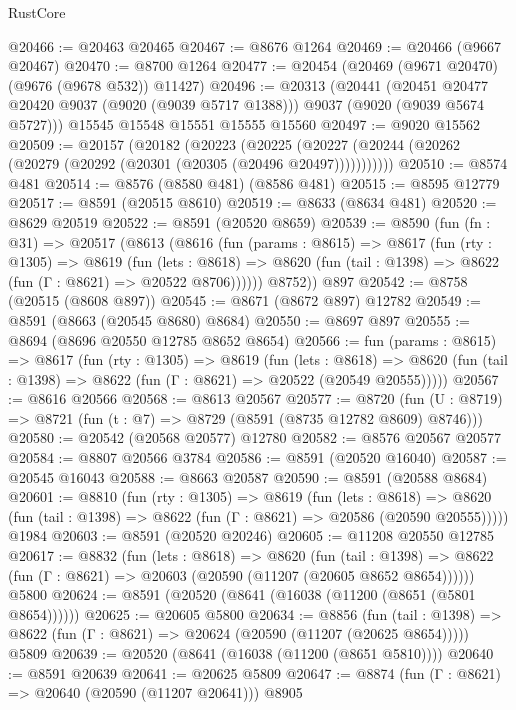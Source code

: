 \begin{lexlean}{RustCore}
\begin{coremodule}
@20466 := @20463 @20465
@20467 := @8676 @1264
@20469 := @20466 (@9667 @20467)
@20470 := @8700 @1264
@20477 := @20454 (@20469 (@9671 @20470) (@9676 (@9678 @532)) @11427)
@20496 := @20313
    (@20441
      (@20451 @20477 @20420 @9037 (@9020 (@9039 @5717 @1388)))
      @9037
      (@9020 (@9039 @5674 @5727)))
    @15545
    @15548
    @15551
    @15555
    @15560
@20497 := @9020 @15562
@20509 := @20157
    (@20182
      (@20223
        (@20225 (@20227 (@20244 (@20262 (@20279 (@20292 (@20301 (@20305 (@20496 @20497)))))))))))
@20510 := @8574 @481
@20514 := @8576 (@8580 @481) (@8586 @481)
@20515 := @8595 @12779
@20517 := @8591 (@20515 @8610)
@20519 := @8633 (@8634 @481)
@20520 := @8629 @20519
@20522 := @8591 (@20520 @8659)
@20539 := @8590
    (fun (fn : @31) =>
    @20517
      (@8613
        (@8616
          (fun (params : @8615) =>
          @8617
            (fun (rty : @1305) =>
            @8619
              (fun (lets : @8618) =>
              @8620 (fun (tail : @1398) => @8622 (fun (Γ : @8621) => @20522 @8706))))))
        @8752))
    @897
@20542 := @8758 (@20515 (@8608 @897))
@20545 := @8671 (@8672 @897) @12782
@20549 := @8591 (@8663 (@20545 @8680) @8684)
@20550 := @8697 @897
@20555 := @8694 (@8696 @20550 @12785 @8652 @8654)
@20566 := fun (params : @8615) =>
  @8617
    (fun (rty : @1305) =>
    @8619
      (fun (lets : @8618) =>
      @8620 (fun (tail : @1398) => @8622 (fun (Γ : @8621) => @20522 (@20549 @20555)))))
@20567 := @8616 @20566
@20568 := @8613 @20567
@20577 := @8720
    (fun (U : @8719) => @8721 (fun (t : @7) => @8729 (@8591 (@8735 @12782 @8609) @8746)))
@20580 := @20542 (@20568 @20577) @12780
@20582 := @8576 @20567 @20577
@20584 := @8807 @20566 @3784
@20586 := @8591 (@20520 @16040)
@20587 := @20545 @16043
@20588 := @8663 @20587
@20590 := @8591 (@20588 @8684)
@20601 := @8810
    (fun (rty : @1305) =>
    @8619
      (fun (lets : @8618) =>
      @8620 (fun (tail : @1398) => @8622 (fun (Γ : @8621) => @20586 (@20590 @20555)))))
    @1984
@20603 := @8591 (@20520 @20246)
@20605 := @11208 @20550 @12785
@20617 := @8832
    (fun (lets : @8618) =>
    @8620
      (fun (tail : @1398) =>
      @8622 (fun (Γ : @8621) => @20603 (@20590 (@11207 (@20605 @8652 @8654))))))
    @5800
@20624 := @8591 (@20520 (@8641 (@16038 (@11200 (@8651 (@5801 @8654))))))
@20625 := @20605 @5800
@20634 := @8856
    (fun (tail : @1398) => @8622 (fun (Γ : @8621) => @20624 (@20590 (@11207 (@20625 @8654)))))
    @5809
@20639 := @20520 (@8641 (@16038 (@11200 (@8651 @5810))))
@20640 := @8591 @20639
@20641 := @20625 @5809
@20647 := @8874 (fun (Γ : @8621) => @20640 (@20590 (@11207 @20641))) @8905

\end{coremodule}
\end{lexlean}
